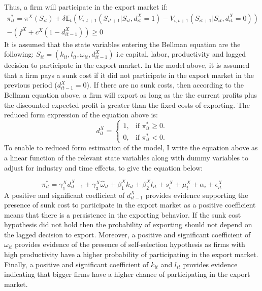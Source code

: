 \documentclass[12pt]{article}
\begin{document}
 Thus, a firm will participate in the export market if:
\begin{equation}
\begin{aligned}
\pi_{it}^{*} = \pi^{X}(S_{it})  +
\delta \mathbb{E}_{t}(V_{i,t+1}(S_{it+1}|S_{it},d_{it}^{X}=1) -
V_{i,t+1}(S_{it+1}|S_{it},d_{it}^{X}=0))\\ 
-  (f^{X} +
c^{X}(1-d_{it-1}^{X})) \geq 0
\end{aligned}
\end{equation}
It is assumed that the state variables entering the Bellman equation
are the following: $S_{it}= (k_{it}, l_{it}, \omega_{it},
d_{it-1}^{X})$ i.e capital, labor, productivity and lagged decision to
participate in the export market. In the model above, it is assumed
that a firm pays a sunk cost if it did not participate in the export
market in the previous period  ($d_{it-1}^{X} = 0$).  If there are no sunk costs, then
according to the Bellman equation above, a firm will export as long as
the the current profits plus the discounted expected profit is greater
than the fixed costs of exporting. 
The reduced form expression of the equation above is: 
\begin{equation}
  d_{it}^{X}=\begin{cases}
   1 , & \text{if $\pi_{it}^{*} \geq 0$}.\\
   0 , & \text{if $\pi_{it}^{*}<  0$}.
  \end{cases}
\end{equation}
To enable to reduced form estimation of the model, I write the equation above as a linear
function of the relevant state variables along with dummy variables to
adjust for industry and time effects, to give the equation below:

\begin{equation}
  \pi_{it}^{*}=   \gamma_{1}^{X} d_{it-1}^{X} + 
\gamma_{3}^{X} \hat{\omega}_{it}  + \beta_{1}^{X}k_{it}  +\beta_{2}^{X}l_{it}+
s_{i}^{X} + \mu_{t}^{X}  + \alpha_{i}+ \epsilon_{it}^{X}
\end{equation}
A positive and significant coefficient of  $d_{it-1}^{X}$ provides
evidence supporting the presence of sunk cost to participate in the
export market  as a positive coefficient means that there is a
persistence in the exporting behavior. 
If the sunk cost hypothesis did not hold then the probability of exporting
should not depend on the lagged decision to export. Moreover, a positive and significant
coefficient of $\omega_{it}$  provides evidence of the presence of 
self-selection hypothesis as firms with high
productivity have a higher probability of participating  in the export
market. Finally, a positive and significant coefficient of $k_{it}$
and $l_{it}$ provides evidence indicating that bigger firms have a
higher chance of participating in the export market. 
\end{document}
